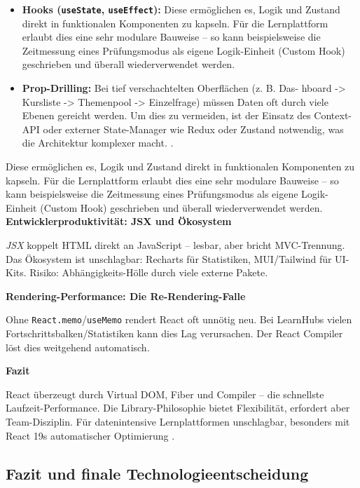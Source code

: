 \begin{itemize}
\item \textbf{Hooks (\texttt{useState}, \texttt{useEffect}):} Diese ermöglichen es, Logik und Zustand
direkt in funktionalen Komponenten zu kapseln. Für die Lernplattform erlaubt
dies eine sehr modulare Bauweise – so kann beispielsweise die Zeitmessung eines
Prüfungsmodus als eigene Logik-Einheit (Custom Hook) geschrieben und überall
wiederverwendet werden.
\item \textbf{Prop-Drilling:} Bei tief verschachtelten Oberflächen (z. B. Das-
hboard -> Kursliste -> Themenpool -> Einzelfrage) müssen Daten oft durch
viele Ebenen gereicht werden. Um dies zu vermeiden, ist der Einsatz des Context-
API oder externer State-Manager wie Redux oder Zustand notwendig, was die
Architektur komplexer macht. \cite{ReactHooks}.
\end{itemize}
Diese ermöglichen es, Logik und Zustand
direkt in funktionalen Komponenten zu kapseln. Für die Lernplattform erlaubt
dies eine sehr modulare Bauweise – so kann beispielsweise die Zeitmessung eines
Prüfungsmodus als eigene Logik-Einheit (Custom Hook) geschrieben und überall
wiederverwendet werden.
\vspace{0.7cm}
\textbf{Entwicklerproduktivität: JSX und Ökosystem}

\textit{JSX} koppelt HTML direkt an JavaScript – lesbar, aber bricht MVC-Trennung. Das Ökosystem ist unschlagbar: Recharts für Statistiken, MUI/Tailwind für UI-Kits. Risiko: Abhängigkeits-Hölle durch viele externe Pakete.

\vspace{0.7cm}
\textbf{Rendering-Performance: Die Re-Rendering-Falle}

Ohne \texttt{React.memo}/\texttt{useMemo} rendert React oft unnötig neu. Bei LearnHubs vielen Fortschrittsbalken/Statistiken kann dies Lag verursachen. Der React Compiler löst dies weitgehend automatisch.

\vspace{0.7cm}
\textbf{Fazit}

React überzeugt durch Virtual DOM, Fiber und Compiler – die schnellste Laufzeit-Performance. Die Library-Philosophie bietet Flexibilität, erfordert aber Team-Disziplin. Für datenintensive Lernplattformen unschlagbar, besonders mit React 19s automatischer Optimierung \cite{ReactEcosystem}.



\subsection{Fazit und finale Technologieentscheidung}
\setauthor{\secondauthor}


